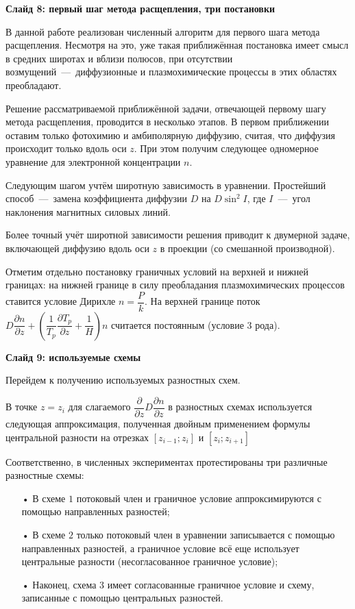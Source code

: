 \documentclass[2pt, a4paper, fleqn]{extarticle}
\begin{document}
{\bf Слайд 8: первый шаг метода расщепления, три постановки}

В данной работе реализован численный алгоритм для первого шага метода расщепления. Несмотря на это, уже такая приближённая постановка имеет смысл в средних широтах и вблизи полюсов, при отсутствии возмущений~---~диффузионные и плазмохимические процессы в этих областях преобладают.

Решение рассматриваемой приближённой задачи, отвечающей первому шагу метода расщепления, проводится в несколько этапов. В первом приближении оставим только фотохимию и амбиполярную диффузию, считая, что диффузия происходит только вдоль оси $z$. При этом получим следующее одномерное уравнение для электронной концентрации $n$.

Следующим шагом учтём широтную зависимость в уравнении. Простейший способ~---~замена коэффициента диффузии $D$ на $D\sin^2I$, где $I$~---~угол наклонения магнитных силовых линий.

Более точный учёт широтной зависимости решения приводит к двумерной задаче, включающей диффузию вдоль оси $z$ в проекции (со смешанной производной).

Отметим отдельно постановку граничных условий на верхней и нижней границах: на нижней границе в силу преобладания плазмохимических процессов ставится условие Дирихле $n = \dfrac{P}{k}$. На верхней границе поток $D\dfrac{\partial n}{\partial z} + \left(\dfrac{1}{T_p}\dfrac{\partial T_p}{\partial z} + \dfrac{1}{H}\right)n$ считается постоянным (условие 3 рода).

\medskip

{\bf Слайд 9: используемые схемы}

Перейдем к получению используемых разностных схем. 


В точке $z=z_i$ для слагаемого $\dfrac{\partial}{\partial z}D\dfrac{\partial n}{\partial z}$ в разностных схемах используется следующая аппроксимация, полученная двойным применением формулы центральной разности на отрезках $[z_{i-1};z_i]$ и $[z_i; z_{i+1}]$

Соответственно, в численных экспериментах протестированы три различные разностные схемы: 
\begin{itemize}
\item[•] В схеме $1$ потоковый член и граничное условие аппроксимируются с помощью направленных разностей; 
\item[•] В схеме $2$ только потоковый член в уравнении записывается с помощью направленных разностей, а граничное условие всё еще использует центральные разности (несогласованное граничное условие);
\item[•] Наконец, схема $3$ имеет согласованные граничное условие и схему, записанные с помощью центральных разностей.
\end{itemize}
\end{document}
